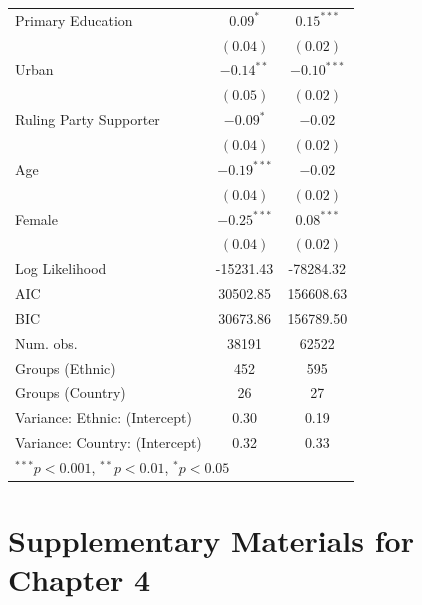 \documentclass[12pt,]{book}
\let\origtable\table
\let\endorigtable\endtable
\renewenvironment{table}[1][2] {
    \singlespacing
    \expandafter\origtable\expandafter[H]
} {
    \endorigtable
}
\theoremstyle{definition}
\theoremstyle{definition}
\theoremstyle{definition}
\theoremstyle{remark}
\begin{document}
\begin{table}
\begin{center}
\begin{tabular}{l c c }
Primary Education                       & $0.09^{*}$    & $0.15^{***}$  \\
                                        & $(0.04)$      & $(0.02)$      \\
Urban                                   & $-0.14^{**}$  & $-0.10^{***}$ \\
                                        & $(0.05)$      & $(0.02)$      \\
Ruling Party Supporter                  & $-0.09^{*}$   & $-0.02$       \\
                                        & $(0.04)$      & $(0.02)$      \\
Age                                     & $-0.19^{***}$ & $-0.02$       \\
                                        & $(0.04)$      & $(0.02)$      \\
Female                                  & $-0.25^{***}$ & $0.08^{***}$  \\
                                        & $(0.04)$      & $(0.02)$      \\
\hline
Log Likelihood                          & -15231.43     & -78284.32     \\
AIC                                     & 30502.85      & 156608.63     \\
BIC                                     & 30673.86      & 156789.50     \\
Num. obs.                               & 38191         & 62522         \\
Groups (Ethnic)                         & 452           & 595           \\
Groups (Country)                        & 26            & 27            \\
Variance: Ethnic: (Intercept)           & 0.30          & 0.19          \\
Variance: Country: (Intercept)          & 0.32          & 0.33          \\
\hline
\multicolumn{3}{l}{\scriptsize{$^{***}p<0.001$, $^{**}p<0.01$, $^*p<0.05$}}
\end{tabular}
\caption{Multilevel Ordinal Models of Attitudes Toward Violence and Ethnic Identity}
\label{tab:ordinal}
\end{center}
\end{table}

\hypertarget{supplementary-materials-for-chapter-4}{%
\section{Supplementary Materials for Chapter
4}\label{supplementary-materials-for-chapter-4}}
\end{document}
